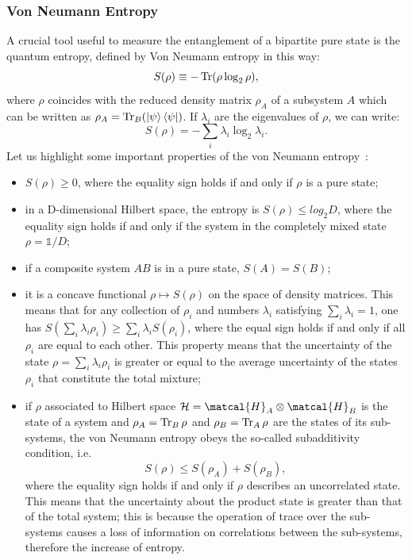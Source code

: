 \subsubsection{Von Neumann Entropy}
A crucial tool useful to measure the entanglement of a bipartite pure state is the quantum entropy, defined by Von Neumann entropy in this way:
\begin{equation}
    S(\rho) \equiv -\operatorname{Tr} ( \rho \log_2\rho),
\end{equation}
where $\rho$ coincides with the reduced density matrix $\rho_A$ of a subsystem $A$ which can be written as $\rho_A = \operatorname{Tr}_B (\ket{\psi}\bra{\psi})$. If $\lambda_i$ are the eigenvalues of $\rho$, we can write:
\begin{equation*}
    S(\rho) = -\sum_i \lambda_i \log_2 \lambda_i.
\end{equation*}
Let us highlight some important properties of the von Neumann entropy~\cite{nielsen_chuang, pet_breuer:open_quantum}:
\begin{itemize}
    \item $S(\rho) \geq 0$, where the equality sign holds if and only if $\rho$ is a pure state;
    \item in a D-dimensional Hilbert space, the entropy is $S(\rho) \leq log_2 D$, where the equality sign holds if and only if the system in the completely mixed state $\rho = \mathds{1}/D$;
    \item if a composite system $AB$ is in a pure state, $S(A) = S(B)$;
    \item it is a concave functional $\rho \mapsto S(\rho)$ on the space of density matrices. This means that for any collection of $\rho_i$ and numbers $\lambda_i$ satisfying $\sum_i \lambda_i = 1$, one has $S(\sum_i \lambda_i \rho_i) \geq \sum_i \lambda_i S(\rho_i)$, where the equal sign holds if and only if all $\rho_i$ are equal to each other. This property means that the uncertainty of the state $\rho = \sum_i \lambda_i \rho_i$ is greater or equal to the average uncertainty of the states $\rho_i$ that constitute the total mixture;
    \item if $\rho$ associated to Hilbert space $ \mathcal{H} = \matcal{H}_A \otimes \matcal{H}_B$ is the state of a system and $\rho_A = \operatorname{Tr}_B \rho$ and $\rho_B = \operatorname{Tr}_A \rho$ are the states of its sub-systems, the von Neumann entropy obeys the so-called subadditivity condition, i.e.
    \begin{equation*}
        S(\rho) \leq S(\rho_A) + S(\rho_B),
    \end{equation*}
    where the equality sign holds if and only if $\rho$ describes an uncorrelated state. This means that the uncertainty about the product state is greater than that of the total system; this is because the operation of trace over the sub-systems causes a loss of information on correlations between the sub-systems, therefore the increase of entropy.
\end{itemize}

